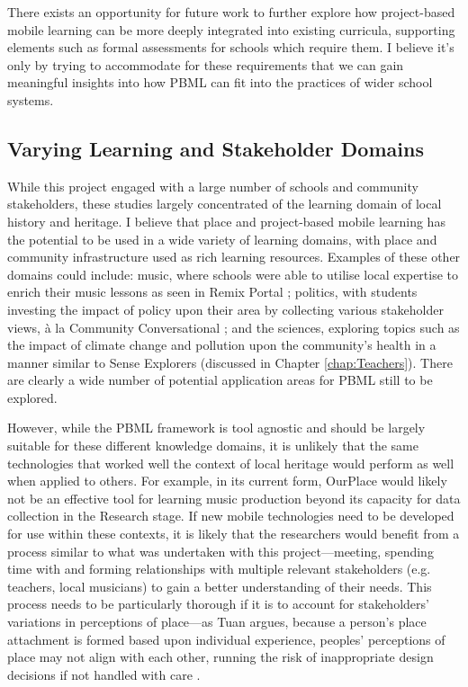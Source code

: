 There exists an opportunity for future work to further explore how project-based mobile learning can be more deeply integrated into existing curricula, supporting elements such as formal assessments for schools which require them. I believe it's only by trying to accommodate for these requirements that we can gain meaningful insights into how PBML can fit into the practices of wider school systems. 

\subsection*{Varying Learning and Stakeholder Domains}

While this project engaged with a large number of schools and community stakeholders, these studies largely concentrated of the learning domain of local history and heritage. I believe that place and project-based mobile learning has the potential to be used in a wide variety of learning domains, with place and community infrastructure used as rich learning resources. Examples of these other domains could include: music, where schools were able to utilise local expertise to enrich their music lessons as seen in Remix Portal \citep{Dodds2017}; politics, with students investing the impact of policy upon their area by collecting various stakeholder views, \`a la Community Conversational \citep{Johnson2017}; and the sciences, exploring topics such as the impact of climate change and pollution upon the community's health in a manner similar to Sense Explorers (discussed in Chapter \ref{chap:Teachers}). There are clearly a wide number of potential application areas for PBML still to be explored.

However, while the PBML framework is tool agnostic and should be largely suitable for these different knowledge domains, it is unlikely that the same technologies that worked well the context of local heritage would perform as well when applied to others. For example, in its current form, OurPlace would likely not be an effective tool for learning music production beyond its capacity for data collection in the Research stage. If new mobile technologies need to be developed for use within these contexts, it is likely that the researchers would benefit from a process similar to what was undertaken with this project---meeting, spending time with and forming relationships with multiple relevant stakeholders (e.g. teachers, local musicians) to gain a better understanding of their needs. This process needs to be particularly thorough if it is to account for stakeholders' variations in perceptions of place---as Tuan argues, because a person’s place attachment is formed based upon individual experience, peoples' perceptions of place may not align with each other, running the risk of inappropriate design decisions if not handled with care \citep{Tuan1978}.

